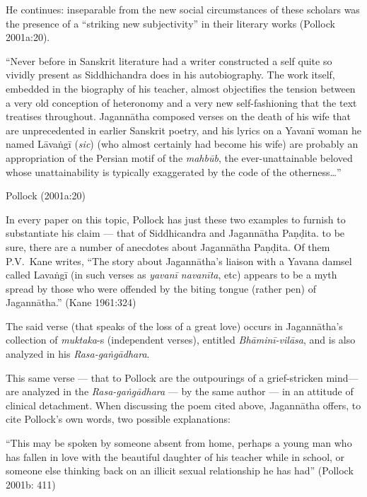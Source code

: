 He continues: inseparable from the new social circumstances of these scholars was the presence of a “striking new subjectivity” in their literary works (Pollock 2001a:20).  
\begin{myquote}
“Never before in Sanskrit literature had a writer constructed a self quite so vividly present as Siddhichandra does in his autobiography. The work itself, embedded in the biography of his teacher, almost objectifies the tension between a very old conception of heteronomy and a very new self-fashioning that the text treatises throughout. Jagannātha composed verses on the death of his wife that are unprecedented in earlier Sanskrit poetry, and his lyrics on a Yavanī woman he named Lāvaṅgī ({\em sic}) (who almost certainly had become his wife) are probably an appropriation of the Persian motif of the {\sl mahbūb}, the ever-unattainable beloved whose unattainability is typically exaggerated by the code of the otherness…” 

\hfill Pollock (2001a:20)
\end{myquote}

In every paper on this topic, Pollock has just these two examples to furnish to substantiate his claim — that of Siddhicandra and Jagannātha Paṇḍita. to be sure, there are a number of anecdotes about Jagannātha Paṇḍita. Of them P.V.\ Kane writes, “The story about Jagannātha’s liaison with a Yavana damsel called Lavaṅgī (in such verses as {\sl yavanī navanīta}, etc) appears to be a myth spread by those who were offended by the biting tongue (rather pen) of Jagannātha.” (Kane 1961:324) 

The said verse (that speaks of the loss of a great love) occurs in Jagannātha’s collection of {\sl muktaka}-s (independent verses), entitled {\sl Bhāminī-vilāsa}, and is also analyzed in his {\sl Rasa-gaṅgādhara}. 

This same verse — that to Pollock are the outpourings of a grief-stricken mind— are analyzed in the {\sl Rasa-gaṅgādhara} — by the same author — in an attitude of clinical detachment. When discussing the poem cited above, Jagannātha offers, to cite Pollock’s own words, two possible explanations: 

\begin{myquote}
“This may be spoken by someone absent from home, perhaps a young man who has fallen in love with the beautiful daughter of his teacher while in school, or someone else thinking back on an illicit sexual relationship he has had” 
\hfill (Pollock 2001b: 411) 
\end{myquote}

